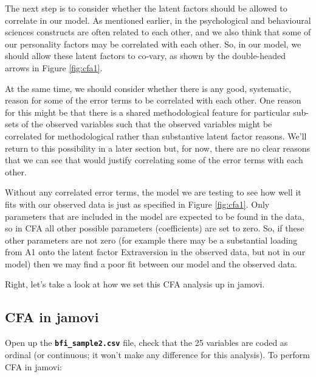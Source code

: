 \documentclass[
]{book}
\begin{document}
The next step is to consider whether the latent factors should be allowed to correlate in our model. As mentioned earlier, in the psychological and behavioural sciences constructs are often related to each other, and we also think that some of our personality factors may be correlated with each other. So, in our model, we should allow these latent factors to co-vary, as shown by the double-headed arrows in Figure \ref{fig:cfa1}.

At the same time, we should consider whether there is any good, systematic, reason for some of the error terms to be correlated with each other. One reason for this might be that there is a shared methodological feature for particular sub-sets of the observed variables such that the observed variables might be correlated for methodological rather than substantive latent factor reasons. We'll return to this possibility in a later section but, for now, there are no clear reasons that we can see that would justify correlating some of the error terms with each other.

Without any correlated error terms, the model we are testing to see how well it fits with our observed data is just as specified in Figure \ref{fig:cfa1}. Only parameters that are included in the model are expected to be found in the data, so in CFA all other possible parameters (coefficients) are set to zero. So, if these other parameters are not zero (for example there may be a substantial loading from A1 onto the latent factor Extraversion in the observed data, but not in our model) then we may find a poor fit between our model and the observed data.

Right, let's take a look at how we set this CFA analysis up in jamovi.

\hypertarget{cfa-in-jamovi}{%
\subsection{CFA in jamovi}\label{cfa-in-jamovi}}

Open up the \textbf{\texttt{bfi\_sample2.csv}} file, check that the 25 variables are coded as ordinal (or continuous; it won't make any difference for this analysis). To perform CFA in jamovi:
\end{document}
